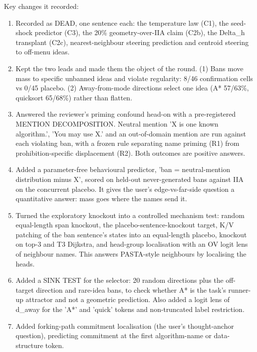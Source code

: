 \documentclass[11pt,letterpaper]{article}
\begin{document}
Key changes it recorded:

\begin{enumerate}\small

\item Recorded as DEAD, one sentence each: the temperature law (C1), the seed-shock predictor (C3), the 20\% geometry-over-IIA claim (C2b), the Delta\_h transplant (C2c), nearest-neighbour steering prediction and centroid steering to off-menu ideas.

\item Kept the two leads and made them the object of the round. (1) Bans move mass to specific unbanned ideas and violate regularity: 8/46 confirmation cells vs 0/45 placebo. (2) Away-from-mode directions select one idea (A* 57/63\%, quicksort 65/68\%) rather than flatten.

\item Answered the reviewer's priming confound head-on with a pre-registered MENTION DECOMPOSITION. Neutral mention 'X is one known algorithm.', 'You may use X.' and an out-of-domain mention are run against each violating ban, with a frozen rule separating name priming (R1) from prohibition-specific displacement (R2). Both outcomes are positive answers.

\item Added a parameter-free behavioural predictor, 'ban = neutral-mention distribution minus X', scored on held-out never-generated bans against IIA on the concurrent placebo. It gives the user's edge-vs-far-side question a quantitative answer: mass goes where the names send it.

\item Turned the exploratory knockout into a controlled mechanism test: random equal-length span knockout, the placebo-sentence-knockout target, K/V patching of the ban sentence's states into an equal-length placebo, knockout on top-3 and T3 Dijkstra, and head-group localisation with an OV logit lens of neighbour names. This answers PASTA-style neighbours by localising the heads.

\item Added a SINK TEST for the selector: 20 random directions plus the off-target direction and rare-idea bans, to check whether A* is the task's runner-up attractor and not a geometric prediction. Also added a logit lens of d\_away for the 'A*' and 'quick' tokens and non-truncated label restriction.

\item Added forking-path commitment localisation (the user's thought-anchor question), predicting commitment at the first algorithm-name or data-structure token.


\end{enumerate}
\end{document}
